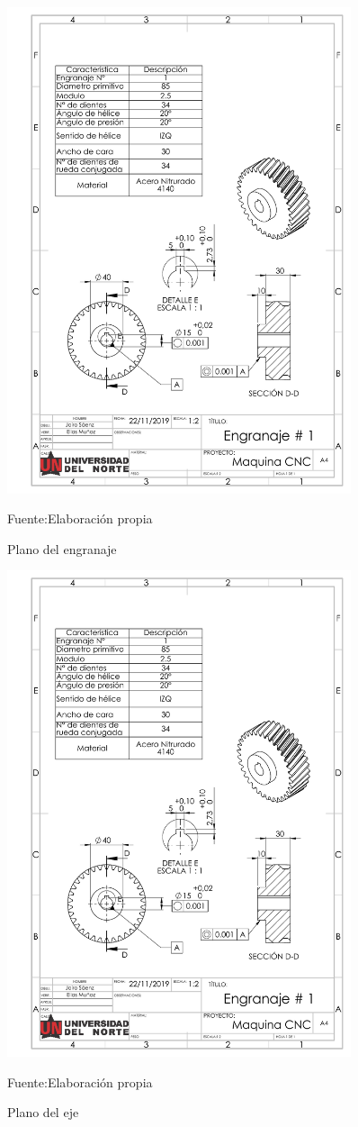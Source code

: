\begin{figure}[ht]
    \centering
    \includegraphics[width =0.9\textwidth]{Cap5_DisenoDetallado/Figuras/engranaje_1.PDF}
    \caption{Plano del engranaje}{Fuente:Elaboración propia}
    \label{fig:Planos_engranaje}
\end{figure}


\begin{figure}[ht]
    \centering
    \includegraphics[width =0.9\textwidth]{Cap5_DisenoDetallado/Figuras/engranaje_1.PDF}
    \caption{Plano del eje}{Fuente:Elaboración propia}
    \label{fig:Planos_eje}
\end{figure}